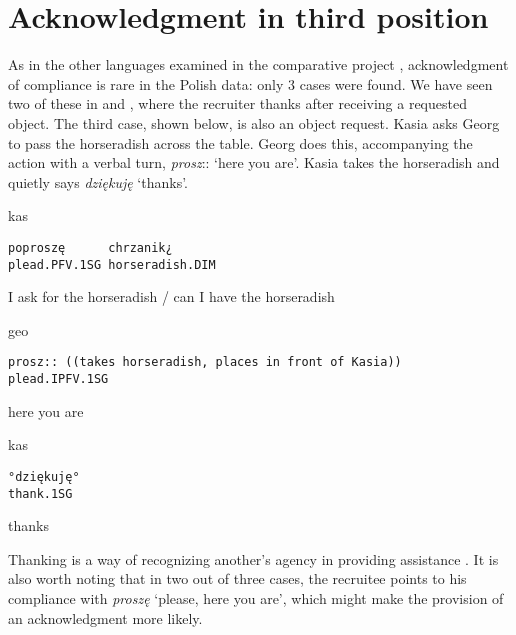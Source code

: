 \documentclass[output=paper]{langsci/langscibook}
\begin{document}
\section{Acknowledgment in third position}\label{sec:zinken:5}

As in the other languages examined in the comparative project \citep{FloydEtAl2018}, acknowledgment of compliance is rare in the Polish data: only 3 cases were found.  We have seen two of these in  and , where the recruiter thanks after receiving a requested object.  The third case, shown below, is also an object request.  Kasia asks Georg to pass the horseradish across the table.  Georg does this, accompanying the action with a verbal turn, \textit{prosz}:: `here you are'.  Kasia takes the horseradish and quietly says \textit{dziękuję} `thanks'.

\vspace{-1mm}
%
\begin{mdframednoverticalspace}[style=firstfoc]
\begin{transbox}{1}{kas}
\begin{verbatim}
poproszę      chrzanik¿
plead.PFV.1SG horseradish.DIM
\end{verbatim}
I ask for the horseradish / can I have the horseradish
\end{transbox}
\end{mdframednoverticalspace}
%
\begin{mdframednoverticalspace}[style=secondfoc]
\begin{transbox}{2}{geo}
\begin{verbatim}
prosz:: ((takes horseradish, places in front of Kasia))
plead.IPFV.1SG
\end{verbatim}
here you are
\end{transbox}
\end{mdframednoverticalspace}
%
\begin{transbox}{3}{kas}
\begin{verbatim}
°dziękuję°
thank.1SG
\end{verbatim}
thanks
\end{transbox}\bigskip

Thanking is a way of recognizing another’s agency in providing assistance \citep{ZinkenRossiReddy}.  It is also worth noting that in two out of three cases, the recruitee points to his compliance with \textit{proszę} `please, here you are', which might make the provision of an acknowledgment more likely.
\end{document}
